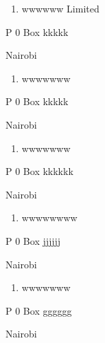 \documentclass[12pt,a4paper]{article}
\begin{document}
\begin{enumerate}
\item wwwwww Limited 

\end{enumerate}
\begin{flushleft}P 0 Box kkkkk\end{flushleft}


\begin{flushleft}Nairobi\end{flushleft}


\begin{enumerate}
\item wwwwwww 

\end{enumerate}
\begin{flushleft}P 0 Box kkkkk\end{flushleft}


\begin{flushleft}Nairobi\end{flushleft}


\begin{enumerate}
\item wwwwwww 

\end{enumerate}
\begin{flushleft}P 0 Box kkkkkk\end{flushleft}


\begin{flushleft}Nairobi\end{flushleft}


\begin{enumerate}
\item wwwwwwww 

\end{enumerate}
\begin{flushleft}P 0 Box jjjjjj\end{flushleft}


\begin{flushleft}Nairobi\end{flushleft}


\begin{enumerate}
\item wwwwwww 

\end{enumerate}
\begin{flushleft}P 0 Box gggggg \end{flushleft}


\begin{flushleft}Nairobi\end{flushleft}
\end{document}
